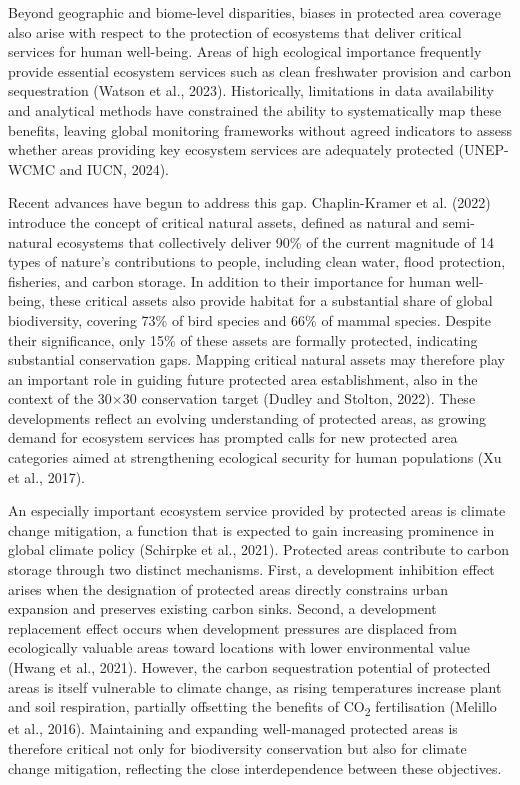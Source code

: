 \documentclass[12pt]{article}
\theoremstyle{break} %
\begin{document}
Beyond geographic and biome-level disparities, biases in protected area coverage also arise with respect to the protection of ecosystems that deliver critical services for human well-being. Areas of high ecological importance frequently provide essential ecosystem services such as clean freshwater provision and carbon sequestration (Watson et al., 2023). Historically, limitations in data availability and analytical methods have constrained the ability to systematically map these benefits, leaving global monitoring frameworks without agreed indicators to assess whether areas providing key ecosystem services are adequately protected (UNEP-WCMC and IUCN, 2024).

Recent advances have begun to address this gap. Chaplin-Kramer et al. (2022) introduce the concept of critical natural assets, defined as natural and semi-natural ecosystems that collectively deliver 90\% of the current magnitude of 14 types of nature’s contributions to people, including clean water, flood protection, fisheries, and carbon storage. In addition to their importance for human well-being, these critical assets also provide habitat for a substantial share of global biodiversity, covering 73\% of bird species and 66\% of mammal species. Despite their significance, only 15\% of these assets are formally protected, indicating substantial conservation gaps. Mapping critical natural assets may therefore play an important role in guiding future protected area establishment, also in the context of the 30×30 conservation target (Dudley and Stolton, 2022). These developments reflect an evolving understanding of protected areas, as growing demand for ecosystem services has prompted calls for new protected area categories aimed at strengthening ecological security for human populations (Xu et al., 2017).

An especially important ecosystem service provided by protected areas is climate change mitigation, a function that is expected to gain increasing prominence in global climate policy (Schirpke et al., 2021). Protected areas contribute to carbon storage through two distinct mechanisms. First, a development inhibition effect arises when the designation of protected areas directly constrains urban expansion and preserves existing carbon sinks. Second, a development replacement effect occurs when development pressures are displaced from ecologically valuable areas toward locations with lower environmental value (Hwang et al., 2021). However, the carbon sequestration potential of protected areas is itself vulnerable to climate change, as rising temperatures increase plant and soil respiration, partially offsetting the benefits of CO\textsubscript{2} fertilisation (Melillo et al., 2016). Maintaining and expanding well-managed protected areas is therefore critical not only for biodiversity conservation but also for climate change mitigation, reflecting the close interdependence between these objectives.
\end{document}
